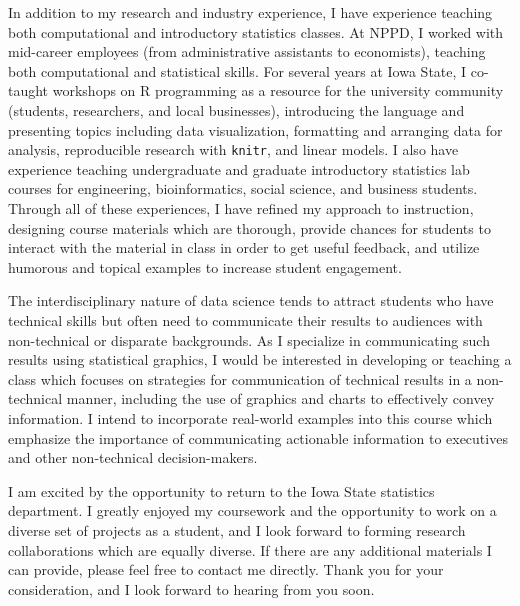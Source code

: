 \documentclass[12pt, letterpaper, sans]{moderncv}
\begin{document}
In addition to my research and industry experience, I have experience teaching both computational and introductory statistics classes. At NPPD, I worked with mid-career employees (from administrative assistants to economists), teaching both computational and statistical skills. For several years at Iowa State, I co-taught workshops on R programming as a resource for the university community (students, researchers, and local businesses), introducing the language and presenting topics including data visualization, formatting and arranging data for analysis, reproducible research with \texttt{knitr}, and linear models. I also have experience teaching undergraduate and graduate introductory statistics lab courses for engineering, bioinformatics, social science, and business students. Through all of these experiences, I have refined my approach to instruction, designing course materials which are thorough, provide chances for students to interact with the material in class in order to get useful feedback, and utilize humorous and topical examples to increase student engagement. 

The interdisciplinary nature of data science tends to attract students who have technical skills but often need to communicate their results to audiences with non-technical or disparate backgrounds. As I specialize in communicating such results using statistical graphics, I would be interested in developing or teaching a class which focuses on strategies for communication of technical results in a non-technical manner, including the use of graphics and charts to effectively convey information. I intend to incorporate real-world examples into this course which emphasize the importance of communicating actionable information to executives and other non-technical decision-makers. 

I am excited by the opportunity to return to the Iowa State statistics department. I greatly enjoyed my coursework and the opportunity to work on a diverse set of projects as a student, and I look forward to forming research collaborations which are equally diverse. If there are any additional materials I can provide, please feel free to contact me directly. Thank you for your consideration, and I look forward to hearing from you soon.


\makeletterclosing
\end{document}
